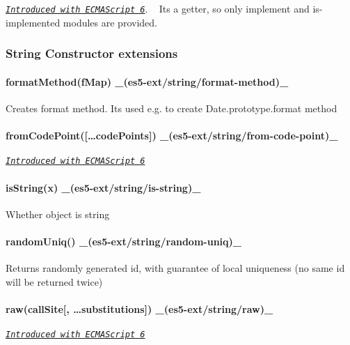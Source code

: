 \href{http://people.mozilla.org/~jorendorff/es6-draft.html#sec-regexp.prototype.unicode}{\tt {\itshape Introduced with E\+C\+M\+A\+Script 6}}. ~\newline
It\textquotesingle{}s a getter, so only {\ttfamily implement} and {\ttfamily is-\/implemented} modules are provided.

\subsubsection*{String Constructor extensions}

\paragraph*{format\+Method(f\+Map) \+\_\+(es5-\/ext/string/format-\/method)\+\_\+}

Creates format method. It\textquotesingle{}s used e.\+g. to create {\ttfamily Date.\+prototype.\+format} method

\paragraph*{from\+Code\+Point(\mbox{[}…code\+Points\mbox{]}) \+\_\+(es5-\/ext/string/from-\/code-\/point)\+\_\+}

\href{http://people.mozilla.org/~jorendorff/es6-draft.html#sec-string.fromcodepoint}{\tt {\itshape Introduced with E\+C\+M\+A\+Script 6}}

\paragraph*{is\+String(x) \+\_\+(es5-\/ext/string/is-\/string)\+\_\+}

Whether object is string

\paragraph*{random\+Uniq() \+\_\+(es5-\/ext/string/random-\/uniq)\+\_\+}

Returns randomly generated id, with guarantee of local uniqueness (no same id will be returned twice)

\paragraph*{raw(call\+Site\mbox{[}, …substitutions\mbox{]}) \+\_\+(es5-\/ext/string/raw)\+\_\+}

\href{http://people.mozilla.org/~jorendorff/es6-draft.html#sec-string.raw}{\tt {\itshape Introduced with E\+C\+M\+A\+Script 6}}

